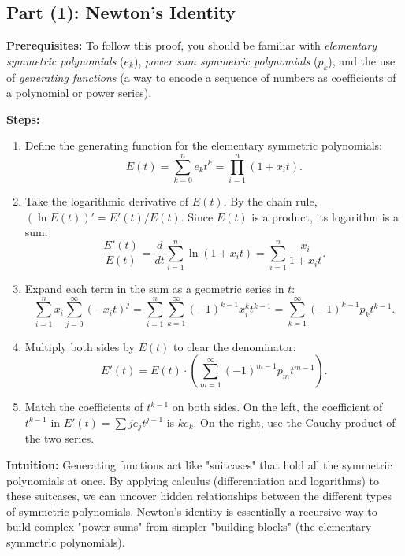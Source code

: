 \begin{solution}
\subsection*{Part (1): Newton's Identity}

\textbf{Prerequisites:}
To follow this proof, you should be familiar with \textit{elementary symmetric polynomials} ($e_k$), \textit{power sum symmetric polynomials} ($p_k$), and the use of \textit{generating functions} (a way to encode a sequence of numbers as coefficients of a polynomial or power series).

\textbf{Steps:}
\begin{enumerate}
    \item Define the generating function for the elementary symmetric polynomials:
    \[ E(t) = \sum_{k=0}^n e_k t^k = \prod_{i=1}^n (1 + x_i t). \]
    \item Take the logarithmic derivative of $E(t)$. By the chain rule, $(\ln E(t))' = E'(t)/E(t)$. Since $E(t)$ is a product, its logarithm is a sum:
    \[ \frac{E'(t)}{E(t)} = \frac{d}{dt} \sum_{i=1}^n \ln(1 + x_i t) = \sum_{i=1}^n \frac{x_i}{1 + x_i t}. \]
    \item Expand each term in the sum as a geometric series in $t$:
    \[ \sum_{i=1}^n x_i \sum_{j=0}^\infty (-x_i t)^j = \sum_{i=1}^n \sum_{k=1}^\infty (-1)^{k-1} x_i^k t^{k-1} = \sum_{k=1}^\infty (-1)^{k-1} p_k t^{k-1}. \]
    \item Multiply both sides by $E(t)$ to clear the denominator:
    \[ E'(t) = E(t) \cdot \left( \sum_{m=1}^\infty (-1)^{m-1} p_m t^{m-1} \right). \]
    \item Match the coefficients of $t^{k-1}$ on both sides. On the left, the coefficient of $t^{k-1}$ in $E'(t) = \sum j e_j t^{j-1}$ is $k e_k$. On the right, use the Cauchy product of the two series.
\end{enumerate}

\textbf{Intuition:}
Generating functions act like "suitcases" that hold all the symmetric polynomials at once. By applying calculus (differentiation and logarithms) to these suitcases, we can uncover hidden relationships between the different types of symmetric polynomials. Newton's identity is essentially a recursive way to build complex "power sums" from simpler "building blocks" (the elementary symmetric polynomials).

\par\vspace{1.5em}


\end{solution}
